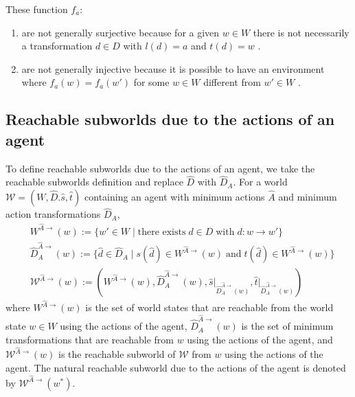 These function $f_{a}$:
\begin{enumerate}[(1)]
	\item are not generally surjective because for a given $w \in W$ there is not necessarily a transformation $d \in D$ with $l(d) = a$ and $t(d) = w$ .

	\item are not generally injective because it is possible to have an environment where $f_{a}(w)=f_{a}(w')$ for some $w \in W$ different from $w' \in W$ .
\end{enumerate}


\subsection{Reachable subworlds due to the actions of an agent}

To define reachable subworlds due to the actions of an agent, we take the reachable subworlds definition and replace $\hat{D}$ with $\hat{D}_{A}$.
For a world $\mathscr{W} = (W, \hat{D}. \hat{s}, \hat{t})$ containing an agent with minimum actions $\hat{A}$ and minimum action transformations $\hat{D}_{A}$,
\begin{align}
    & W^{\hat{A}\to}(w) := \{ w' \in W \mid \text{there exists} \; d \in D \; \text{with} \; d: w \to w' \} \\
    & \hat{D}_{A}^{\hat{A}\to}(w) := \{ \hat{d} \in \hat{D}_{A} \mid s(\hat{d}) \in W^{\hat{A}\to}(w) \; \text{and} \; t(\hat{d}) \in W^{\hat{A}\to}(w) \} \\
    & \mathscr{W}^{\hat{A}\to}(w) := (W^{\hat{A}\to}(w), \hat{D}_{A}^{\hat{A}\to}(w), \hat{s} \big|_{\hat{D}_{A}^{\hat{A}\to}(w)}, \hat{t} \big|_{\hat{D}_{A}^{\hat{A}\to}(w)})
\end{align}
where $W^{\hat{A}\to}(w)$ is the set of world states that are reachable from the world state $w \in W$ using the actions of the agent, $\hat{D}_{A}^{\hat{A}\to}(w)$ is the set of minimum transformations that are reachable from $w$ using the actions of the agent, and $\mathscr{W}^{\hat{A}\to}(w)$ is the reachable subworld of $\mathscr{W}$ from $w$ using the actions of the agent.
The natural reachable subworld due to the actions of the agent is denoted by $\mathscr{W}^{\hat{A}\to}(w^{*})$.


